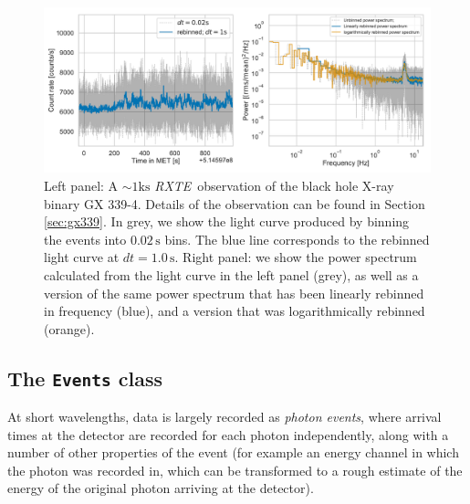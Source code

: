\documentclass[twocolumn]{aastex62}
\newcommand{\project}[1]{\textsl{#1}\xspace}
\newcommand{\rxte}{\project{RXTE}\xspace}
\begin{document}
\begin{figure}[htbp]
\begin{center}
\includegraphics[width=\textwidth]{../figures/example_lc_ps.pdf}
\caption{Left panel: A $\sim 1 \mathrm{ks}$ \rxte\ observation of the black hole X-ray binary GX 339-4. Details of the observation can be found in Section \ref{sec:gx339}. In grey, we show the light curve produced by binning the events into $0.02\,\mathrm{s}$ bins. The blue line corresponds to the rebinned light curve at $dt = 1.0\,\mathrm{s}$. Right panel: we show the power spectrum calculated from the light curve in the left panel (grey), as well as a version of the same power spectrum that has been linearly rebinned in frequency (blue), and a version that was logarithmically rebinned (orange).}
\label{fig:psd}
\end{center}
\end{figure}

\subsection{The \texttt{Events} class}

At short wavelengths, data is largely recorded as \textit{photon events}, where arrival times at the detector are recorded for each photon independently, along with a number of other properties of the event (for example an energy channel in which the photon was recorded in, which can be transformed to a rough estimate of the energy of the original photon arriving at the detector).
\end{document}

